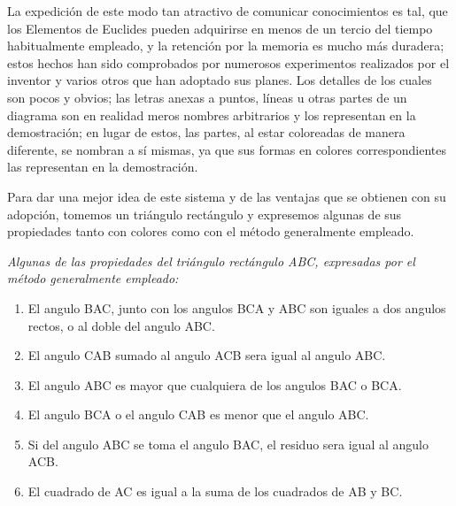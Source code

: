 \documentclass[booklanguage=english]{byrnebook}
\begin{document}
La expedición de este modo tan atractivo de comunicar conocimientos es tal, que los Elementos de Euclides pueden adquirirse en menos de un tercio del tiempo habitualmente empleado, y la retención por la memoria es mucho más duradera; estos hechos han sido comprobados por numerosos experimentos realizados por el inventor y varios otros que han adoptado sus planes. Los detalles de los cuales son pocos y obvios; las letras anexas a puntos, líneas u otras partes de un diagrama son en realidad meros nombres arbitrarios y los representan en la demostración; en lugar de estos, las partes, al estar coloreadas de manera diferente, se nombran a sí mismas, ya que sus formas en colores correspondientes las representan en la demostración.

Para dar una mejor idea de este sistema y de las ventajas que se obtienen con su adopción, tomemos un triángulo rectángulo y expresemos algunas de sus propiedades tanto con colores como con el método generalmente empleado.

\pagebreak


\begin{center}
\drawCurrentPictureInMargin \emph{Algunas de las propiedades del triángulo rectángulo ABC, expresadas por el método generalmente empleado:}
\end{center}

\baselineskip

\begin{enumerate}
\item El angulo BAC, junto con los angulos BCA y ABC son iguales a dos angulos rectos, o al doble del angulo ABC.
\item El angulo CAB sumado al angulo ACB sera igual al angulo ABC.
\item El angulo ABC es mayor que cualquiera de los angulos BAC o BCA.
\item El angulo BCA o el angulo CAB es menor que el angulo ABC.
\item Si del angulo ABC se toma el angulo BAC, el residuo sera igual al angulo ACB.
\item El cuadrado de AC es igual a la suma de los cuadrados de AB y BC.
\end{enumerate}
\end{document}
